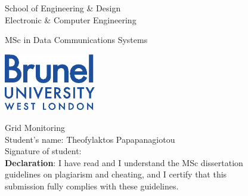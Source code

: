 \thispagestyle{empty}

\begin{center}
\Large
School of Engineering \& Design\\
Electronic \& Computer Engineering\\
\vspace{1\baselineskip}

MSc in Data Communications Systems\\
\vspace{1\baselineskip}

\begin{center}
\includegraphics[width=40mm]{images/brunel_logo.eps}\\
\end{center}
\vspace{0.5\baselineskip}

\Huge
Grid Monitoring\\
\vspace{2\baselineskip}
\Large
Student's name: Theofylaktos Papapanagiotou \\
Signature of student: \\

\vspace{1.8\baselineskip}
\large
{\bf Declaration}: I have read and I understand the MSc dissertation\\
guidelines on plagiarism and cheating, and I certify that this\\
submission fully complies with these guidelines.
\end{center}
